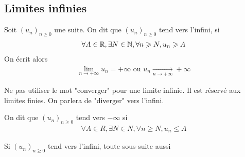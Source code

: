\subsection{Limites infinies}
\begin{graybox}
    \begin{definition}
    Soit $(u_n)_{n \geq 0}$ une suite. On dit que $(u_n)_{n \geq 0}$ tend vers l'infini, si 
    \begin{align*}
    \forall A \in \mathbb{R}, \exists N \in \mathbb{N}, \forall n \geqslant N, u_n \geqslant A
    \end{align*}
    On écrit alors 
    \begin{align*}
    \lim_{n \to +\infty} u_n = +\infty \text{ ou } u_n \xrightarrow[n \to +\infty]{} +\infty
    \end{align*}
\end{definition}
\end{graybox}

\begin{remarque}
    Ne pas utiliser le mot "converger" pour une limite infinie. Il est réservé aux limites finies. On parlera de "diverger" vers l'infini.
\end{remarque}

\begin{graybox}
    \begin{definition}
    On dit que $(u_n)_{n \geq 0}$ tend vers $-\infty$ si 
    \begin{align*}
        \forall A \in R, \exists N \in N, \forall n \geq N, u_n \leq A
    \end{align*}
\end{definition}
\end{graybox}

\begin{remarque}
 Si $(u_n)_{n \geq 0}$ tend vers l'infini, toute sous-suite aussi   
\end{remarque}

